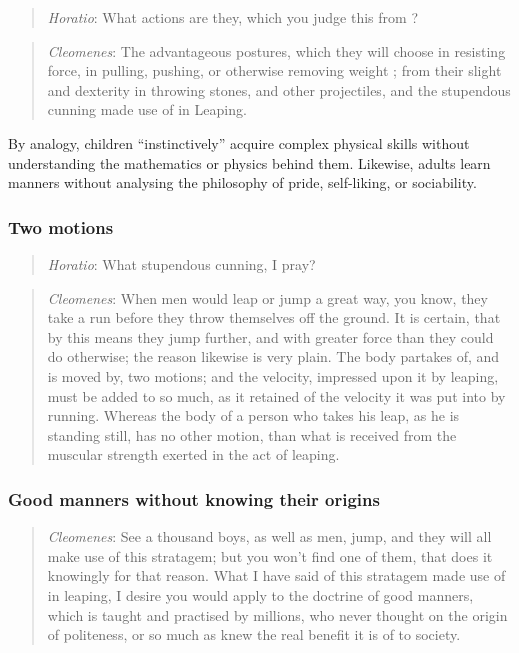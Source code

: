             \begin{quote}
                \textit{Horatio}: What actions are they, which you judge this from ?
            \end{quote}

            \begin{quote}
                \textit{Cleomenes}: The advantageous postures, which they will choose in resisting force, in pulling, pushing, or otherwise removing weight ; from their slight and dexterity in throwing stones, and other projectiles, and the stupendous cunning made use of in Leaping.
            \end{quote}

            By analogy, children “instinctively” acquire complex physical skills without understanding the mathematics or physics behind them. Likewise, adults learn manners without analysing the philosophy of pride, self-liking, or sociability.

        \subsubsection{Two motions}

            \begin{quote}
                \textit{Horatio}: What stupendous cunning, I pray?
            \end{quote}

            \begin{quote}
                \textit{Cleomenes}: When men would leap or jump a great way, you know, they take a run before they throw themselves off the ground. It is certain, that by this means they jump further, and with greater force than they could do otherwise; the reason likewise is very plain. The body partakes of, and is moved by, two motions; and the velocity, impressed upon it by leaping, must be added to so much, as it retained of the velocity it was put into by running. Whereas the body of a person who takes his leap, as he is standing still, has no other motion, than what is received from the muscular strength exerted in the act of leaping.
            \end{quote}

        \subsubsection{Good manners without knowing their origins}

            \begin{quote}
                \textit{Cleomenes}: See a thousand boys, as well as men, jump, and they will all make use of this stratagem; but you won’t find one of them, that does it knowingly for that reason. What I have said of this stratagem made use of in leaping, I desire you would apply to the doctrine of good manners, which is taught and practised by millions, who never thought on the origin of politeness, or so much as knew the real benefit it is of to society.
            \end{quote}

